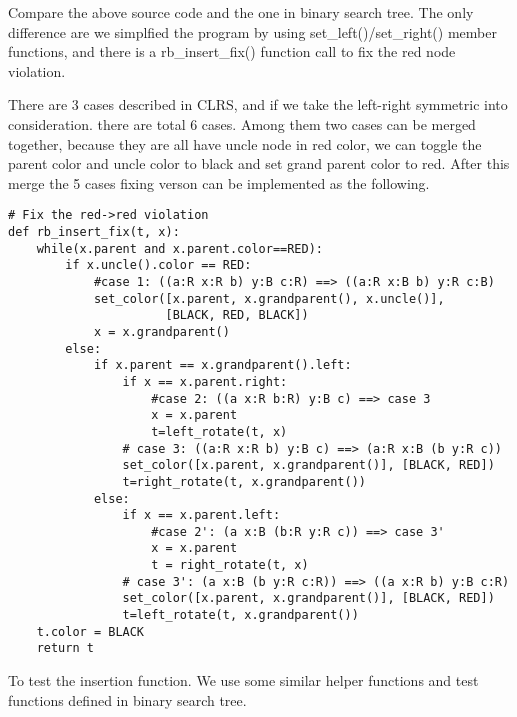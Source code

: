 \documentclass{article}
\begin{document}
Compare the above source code and the one in binary search tree\cite{bst-lxy}. The only difference are we simplfied the program by using set\_left()/set\_right() member functions, and there is a rb\_insert\_fix() function call to fix the red node violation.

There are 3 cases described in CLRS, and if we take the left-right symmetric into consideration. there are total 6 cases. Among them two cases can be merged together, because they are all have uncle node in red color, we can toggle the parent color and uncle color to black and set grand parent color to red. After this merge the 5 cases fixing verson can be implemented as the following.

\begin{lstlisting}
# Fix the red->red violation
def rb_insert_fix(t, x):
    while(x.parent and x.parent.color==RED):
        if x.uncle().color == RED:
            #case 1: ((a:R x:R b) y:B c:R) ==> ((a:R x:B b) y:R c:B)
            set_color([x.parent, x.grandparent(), x.uncle()],
                      [BLACK, RED, BLACK])
            x = x.grandparent()
        else:
            if x.parent == x.grandparent().left:
                if x == x.parent.right:
                    #case 2: ((a x:R b:R) y:B c) ==> case 3
                    x = x.parent
                    t=left_rotate(t, x)
                # case 3: ((a:R x:R b) y:B c) ==> (a:R x:B (b y:R c))
                set_color([x.parent, x.grandparent()], [BLACK, RED])
                t=right_rotate(t, x.grandparent())
            else:
                if x == x.parent.left:
                    #case 2': (a x:B (b:R y:R c)) ==> case 3'
                    x = x.parent
                    t = right_rotate(t, x)
                # case 3': (a x:B (b y:R c:R)) ==> ((a x:R b) y:B c:R)
                set_color([x.parent, x.grandparent()], [BLACK, RED])
                t=left_rotate(t, x.grandparent())
    t.color = BLACK
    return t
\end{lstlisting}

To test the insertion function. We use some similar helper functions and test functions defined in binary search tree\cite{bst-lxy}.
\end{document}
